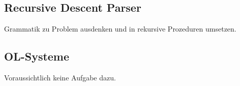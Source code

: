 \documentclass{scrreprt}
\begin{document}
\subsection{Recursive Descent Parser}
Grammatik zu Problem ausdenken und in rekursive Prozeduren umsetzen.

\subsection{OL-Systeme}
Voraussichtlich keine Aufgabe dazu.
\end{document}
